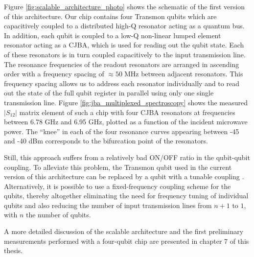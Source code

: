 Figure \ref{fig:scalable_architecture_photo} shows the schematic of the first version of this architecture. Our chip contains four Transmon qubits which are capacitively coupled to a distributed high-Q resonator acting as a quantum bus. In addition, each qubit is coupled to a low-Q non-linear lumped element resonator acting as a CJBA, which is used for reading out the qubit state. Each of these resonators is in turn coupled capacitively to the input transmission line. The resonance frequencies of the readout resonators are arranged in ascending order with a frequency spacing of \mbox{$\approx 50\;\mathrm{MHz}$} between adjacent resonators. This frequency spacing allows us to address each resonator individually and to read out the state of the full qubit register in parallel using only one single transmission line. Figure \ref{fig:jba_multiplexed_spectroscopy} shows the measured $|S_{12}|$ matrix element of such a chip with four CJBA resonators at frequencies between 6.78 GHz and 6.95 GHz, plotted as a function of the incident microwave power. The ``knee'' in each of the four resonance curves appearing between -45 and -40 dBm corresponds to the bifurcation point of the resonators.


Still, this approach suffers from a relatively bad ON/OFF ratio in the qubit-qubit coupling. To alleviate this problem, the Transmon qubit used in the current version of this architecture can be replaced by a qubit with a tunable coupling \citep{srinivasan_tunable_2011}. Alternatively, it is possible to use a fixed-frequency coupling scheme for the qubits, thereby altogether eliminating the need for frequency tuning of individual qubits and also reducing the number of input transmission lines from $n+1$ to $1$, with $n$ the number of qubits.

\smallskip

A more detailed discussion of the scalable architecture and the first preliminary measurements performed with a four-qubit chip are presented in chapter 7 of this thesis.